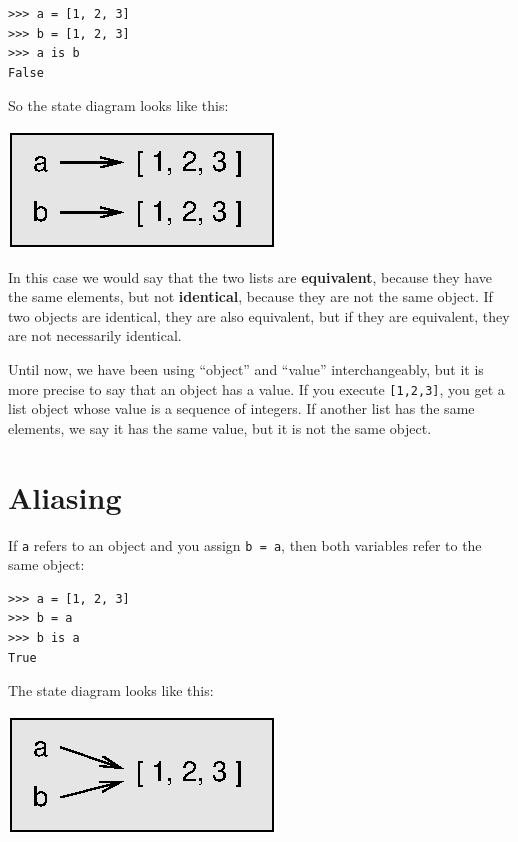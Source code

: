 \documentclass[10pt]{book}
\begin{document}
\beforeverb
\begin{verbatim}
>>> a = [1, 2, 3]
>>> b = [1, 2, 3]
>>> a is b
False
\end{verbatim}
\afterverb
%
So the state diagram looks like this:


\beforefig
\centerline{\includegraphics{figs/list2.eps}}
\afterfig

In this case we would say that the two lists are {\bf equivalent},
because they have the same elements, but not {\bf identical}, because
they are not the same object.  If two objects are identical, they are
also equivalent, but if they are equivalent, they are not necessarily
identical.


Until now, we have been using ``object'' and ``value''
interchangeably, but it is more precise to say that an object has a
value.  If you execute {\tt [1,2,3]}, you get a list
object whose value is a sequence of integers.  If another
list has the same elements, we say it has the same value, but
it is not the same object.



\section{Aliasing}


If {\tt a} refers to an object and you assign {\tt b = a},
then both variables refer to the same object:

\beforeverb
\begin{verbatim}
>>> a = [1, 2, 3]
>>> b = a
>>> b is a
True
\end{verbatim}
\afterverb
%
The state diagram looks like this:


\beforefig
\centerline{\includegraphics{figs/list3.eps}}
\afterfig
\end{document}
